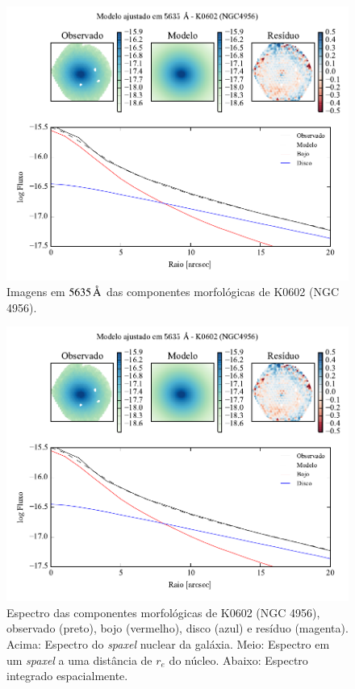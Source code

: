\begin{figure}
	\includegraphics[page=3]{figuras-decomp/K0602_sample006a}
	\caption[Imagens em $5635\,\angstrom$ das componentes morfológicas de K0602
	(NGC 4956)]
	{Imagens em $5635\,\angstrom$ das componentes morfológicas de K0602
	(NGC 4956).}
	\label{fig:decompImages:K0602}
\end{figure}

\begin{figure}
	\includegraphics[page=4]{figuras-decomp/K0602_sample006a}
	\caption[Espectro das componentes morfológicas de K0602 (NGC 4956)]
	{Espectro das componentes morfológicas de K0602 (NGC 4956),
	observado (preto), bojo (vermelho), disco (azul) e resíduo (magenta). Acima:
	Espectro do {\em spaxel} nuclear da galáxia. Meio: Espectro em um {\em spaxel}
	a uma distância de $r_e$ do núcleo. Abaixo: Espectro integrado espacialmente.}
	\label{fig:decompSpectra:K0602}
\end{figure}

